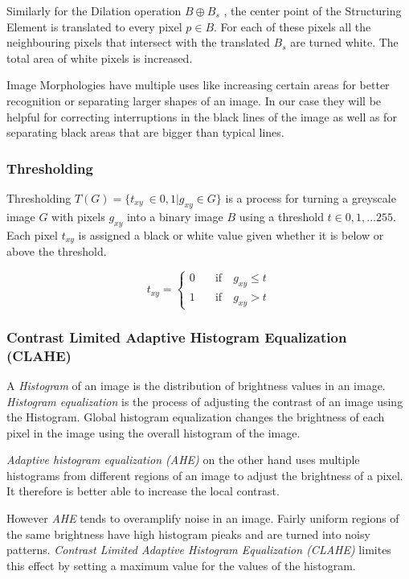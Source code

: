 \documentclass[serif,article,noparskip]{agse-thesis}
\begin{document}
Similarly for the Dilation operation  $B \oplus B_s$ , the center point of the
Structuring Element is translated to every pixel $p \in B$. For each of these
pixels all the neighbouring pixels that intersect with the translated $B_s$ are
turned white. The total area of white pixels is increased. \cite{Smith1997}

Image Morphologies have multiple uses like increasing certain areas for better
recognition or separating larger shapes of an image. In our case they will be
helpful for correcting interruptions in the black lines of the image as well as
for separating black areas that are bigger than typical lines.

\subsubsection{Thresholding}

Thresholding $T(G) = \{t_{xy}\ \in {0,1} | g_{xy} \in G\}$ is a process for turning a greyscale image $G$
with pixels $g_{xy}$ into a binary image $B$ using a threshold $t \in
0,1,\dots255$. Each pixel $t_{xy}$ is assigned a black or white value given
whether it is below or above the threshold.

\begin{equation}
  t_{xy} =
  \begin{cases}
    0 & \quad  \text{if}  \quad g_{xy} \leq t\\
    1  & \quad \text{if}  \quad g_{xy} > t
  \end{cases}
\end{equation}

\subsubsection{Contrast Limited Adaptive Histogram
Equalization (CLAHE)}

A \textit{Histogram} of an image is the distribution of brightness values in an
image. \textit{Histogram equalization} is the process of adjusting the contrast
of an image using the Histogram. Global histogram equalization changes the
brightness of each pixel in the image using the overall histogram of the image.
\cite{ShapiroLindaG2001Cv}

\textit{Adaptive histogram equalization (AHE)} on the other hand uses multiple
histograms from different regions of an image to adjust the brightness of a
pixel. It therefore is better able to increase the local contrast.

However \textit{AHE} tends to overamplify noise in an image. Fairly uniform
regions of the same brightness have high histogram pieaks and are turned into
noisy patterns.  \textit{Contrast Limited Adaptive Histogram Equalization
(CLAHE)} limites this effect by setting a maximum value for the values of the
histogram. \cite{Pizer1987}
\end{document}
